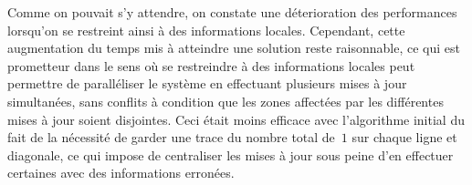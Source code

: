 \documentclass[11pt, openany, a4paper]{article}
\begin{document}
Comme on pouvait s'y attendre, on constate une déterioration des performances lorsqu'on se restreint ainsi à des informations locales. Cependant, cette augmentation du temps mis à atteindre une solution reste raisonnable, ce qui est prometteur dans le sens où se restreindre à des informations locales peut permettre de paralléliser le système en effectuant plusieurs mises à jour simultanées, sans conflits à condition que les zones affectées par les différentes mises à jour soient disjointes. Ceci était moins efficace avec l'algorithme initial du fait de la nécessité de garder une trace du nombre total de~$1$ sur chaque ligne et diagonale, ce qui impose de centraliser les mises à jour sous peine d'en effectuer certaines avec des informations erronées.


\nocite{Pom96}
\nocite{BahiC06}
\nocite{Fat13}



\end{document}
